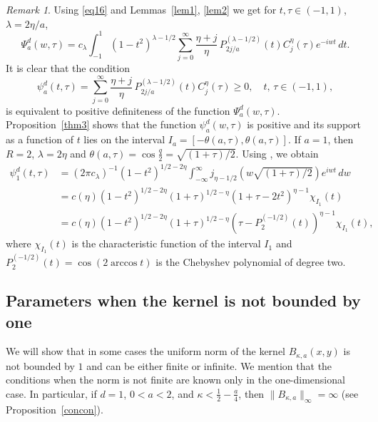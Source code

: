 \documentclass[12pt,twoside,reqno]{amsart}\usepackage[cp1251]{inputenc}
\theoremstyle{plain}
\theoremstyle{remark}
\newtheorem{remark}[theorem]{Remark}
\begin{document}
\begin{remark}\label{rem3}
Using \eqref{eq16} and Lemmas~\ref{lem1}, \ref{lem2} we get for $t,\tau\in (-1,1)$, $\lambda=2\eta/a$,
\begin{equation*}%
\Psi_{a}^d(w,\tau)=c_{\lambda}\int_{-1}^{1}(1-t^2)^{\lambda-1/2}\sum_{j=0}^{\infty}\frac{\eta+j}{\eta}\,P_{2j/a}^{(\lambda-1/2)}(t)
C_{j}^{\eta}(\tau)e^{-iwt}\,dt.
\end{equation*}
It is clear that the condition
\begin{equation*}%
\psi_a^d(t,\tau)=\sum_{j=0}^{\infty}\frac{\eta+j}{\eta}\,P_{2j/a}^{(\lambda-1/2)}(t)
C_{j}^{\eta}(\tau)\ge 0,\quad t,\,\tau\in (-1,1),
\end{equation*}
is equivalent to  positive definiteness of the function $\Psi_{a}^d(w,\tau)$.
Proposition~\ref{thm3} shows that the function $\psi_{a}^d(w,\tau)$ is positive and its support as a function of $t$ lies on the interval $I_a=[-\theta(a,\tau),\theta(a,\tau)]$.
If $a=1$, then $R=2$, $\lambda=2\eta$ and $\theta(a,\tau)=\cos\frac{q}{2}=\sqrt{(1+\tau)/2}$. Using \cite[Chapt. VIII, 8.7(31)]{Ba54}, we obtain
\begin{align*}
\psi_{1}^d(t,\tau)&=(2\pi c_{\lambda})^{-1}(1-t^2)^{1/2-2\eta}\int_{-\infty}^{\infty}j_{\eta-1/2}(w\sqrt{(1+\tau)/2})e^{iwt}\,dw
\\
&=c(\eta)(1-t^2)^{1/2-2\eta}(1+\tau)^{1/2-\eta}(1+\tau-2t^2)^{\eta-1}\chi_{I_1}(t)\\
&=c(\eta)(1-t^2)^{1/2-2\eta}(1+\tau)^{1/2-\eta}(\tau-P_2^{(-1/2)}(t))^{\eta-1}\chi_{I_1}(t),
\end{align*}
where $\chi_{I_1}(t)$ is the characteristic function of the interval $I_1$ and $P_2^{(-1/2)}(t)=
\cos{}(2\arccos t)$ is the Chebyshev polynomial of degree two.
\end{remark}


\subsection{Parameters when the kernel is not bounded by one}\label{subsec4-2}
We will show that in some cases  the uniform norm of the kernel $B_{\kappa,a}(x,y)$
is not bounded by $1$ and %
 can be either finite or infinite.
 We mention that the conditions when the norm is not finite are known only in the one-dimensional case. %
In particular, if $d=1$, $0<a<2$, and $\kappa<\frac{1}{2}-\frac{a}{4}$, then $\|B_{\kappa,a}\|_{\infty}=\infty$ (see Proposition~\ref{concon}).
\end{document}

